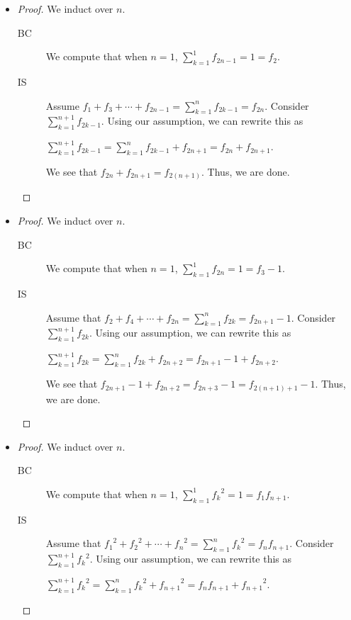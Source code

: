 \documentclass[12pt]{article}
\begin{document}
\begin{enumerate}[start = 1, label = {\bfseries Question \arabic*:}, leftmargin=1in]
\begin{itemize}
        \item[(d)] \begin{proof} We induct over $n$.\begin{description}
            \item[BC] We compute that when $n=1$, $\sum\limits_{k=1}^{1}f_{2n-1}=1=f_2$.
            \item[IS] Assume $f_1+f_3+\cdots+f_{2n-1} = \sum\limits_{k=1}^{n}f_{2k-1}=f_{2n}$. Consider $\sum\limits_{k=1}^{n+1}f_{2k-1}$. Using our assumption, we can rewrite this as \begin{center}
                $\sum\limits_{k=1}^{n+1}f_{2k-1}=\sum\limits_{k=1}^{n}f_{2k-1} + f_{2n+1}=f_{2n}+f_{2n+1}$.
            \end{center} We see that $f_{2n}+f_{2n+1}=f_{2(n+1)}$. Thus, we are done.
        \end{description}
    \end{proof}
        \item[(e)] \begin{proof}We induct over $n$.\begin{description}
            \item[BC]We compute that when $n=1$, $\sum\limits_{k=1}^1f_{2n}=1=f_3-1$.
            \item[IS] Assume that $f_2+f_4+\cdots+f_{2n}=\sum\limits_{k=1}^{n}f_{2k}=f_{2n+1}-1$. Consider $\sum\limits_{k=1}^{n+1}f_{2k}$. Using our assumption, we can rewrite this as \begin{center}
                $\sum\limits_{k=1}^{n+1}f_{2k}=\sum\limits_{k=1}^{n}f_{2k}+f_{2n+2}=f_{2n+1}-1+f_{2n+2}$.
            \end{center} We see that $f_{2n+1}-1+f_{2n+2}=f_{2n+3}-1=f_{2(n+1)+1}-1$. Thus, we are done.
        \end{description}
    \end{proof}
        \item[(f)] \begin{proof}We induct over $n$.\begin{description}
            \item[BC] We compute that when $n=1$, $\sum\limits_{k=1}^1{f_k}^2=1=f_1f_{n+1}$.
            \item[IS] Assume that ${f_1}^2+{f_2}^2+\cdots+{f_n}^2=\sum\limits_{k=1}^{n}{f_k}^2={f_n}f_{n+1}$. Consider $\sum\limits_{k=1}^{n+1}{f_k}^2$. Using our assumption, we can rewrite this as \begin{center}
                $\sum\limits_{k=1}^{n+1}{f_k}^2=\sum\limits_{k=1}^{n}{f_k}^2+{f_{n+1}}^2={f_n}{f_{n+1}}+{f_{n+1}}^2$.

\end{center}
\end{description}
\end{proof}
\end{itemize}
\end{enumerate}
\end{document}
